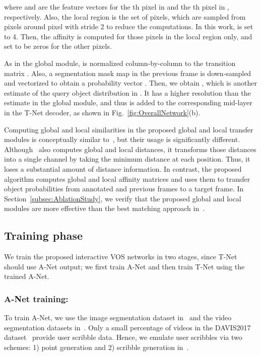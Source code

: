 \documentclass[runningheads]{llncs}
\begin{document}
where  and  are the feature vectors for the th pixel in  and the th pixel in , respectively. Also, the local region  is the set of pixels, which are sampled from  pixels around pixel  with stride 2 to reduce the computations. In this work,  is set to 4. Then, the affinity is computed for those pixels in the local region only, and set to be zeros for the other pixels.

As in the global module,  is normalized column-by-column to the transition matrix . Also, a segmentation mask map  in the previous frame  is down-sampled and vectorized to obtain a probability vector . Then, we obtain , which is another estimate of the query object distribution in . It has a higher resolution than the estimate in the global module, and thus is added to the corresponding mid-layer in the T-Net decoder, as shown in Fig.~\ref{fig:OverallNetwork}(b).

Computing global and local similarities in the proposed global and local transfer modules is conceptually similar to~\cite{voigtlaender2019feelvos}, but their usage is significantly different. Although~\cite{voigtlaender2019feelvos} also computes global and local distances, it transforms those distances into a single channel by taking the minimum distance at each position. Thus, it loses a substantial amount of distance information. In contrast, the proposed algorithm computes global and local affinity matrices and uses them to transfer object probabilities from annotated and previous frames to a target frame. In Section~\ref{subsec:AblationStudy}, we verify that the proposed global and local modules are more effective than the best matching approach in~\cite{voigtlaender2019feelvos}.

\subsection{Training phase} \label{subsec:Training}

We train the proposed interactive VOS networks in two stages, since T-Net should use A-Net output; we first train A-Net and then train T-Net using the trained A-Net.

\subsubsection{A-Net training:} To train A-Net, we use the image segmentation dataset in~\cite{Hariharan2011} and the video segmentation datasets in~\cite{DAVIS2017, Youtube2018}. Only a small percentage of videos in the DAVIS2017 dataset~\cite{DAVIS2017} provide user scribble data. Hence, we emulate user scribbles via two schemes: 1) point generation and 2) scribble generation in~\cite{DAVISchallenge2018}.
\end{document}
